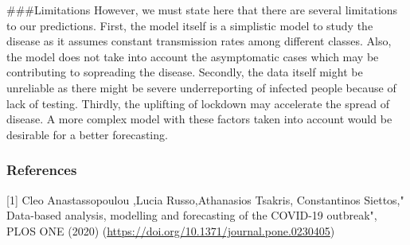 \documentclass[]{article}
\begin{document}
\#\#\#Limitations However, we must state here that there are several
limitations to our predictions. First, the model itself is a simplistic
model to study the disease as it assumes constant transmission rates
among different classes. Also, the model does not take into account the
asymptomatic cases which may be contributing to sopreading the disease.
Secondly, the data itself might be unreliable as there might be severe
underreporting of infected people because of lack of testing. Thirdly,
the uplifting of lockdown may accelerate the spread of disease. A more
complex model with these factors taken into account would be desirable
for a better forecasting.

\hypertarget{references}{%
\subsubsection{References}\label{references}}

{[}1{]} Cleo Anastassopoulou ,Lucia Russo,Athanasios Tsakris,
Constantinos Siettos," Data-based analysis, modelling and forecasting of
the COVID-19 outbreak", PLOS ONE (2020)
(\url{https://doi.org/10.1371/journal.pone.0230405})
\end{document}
